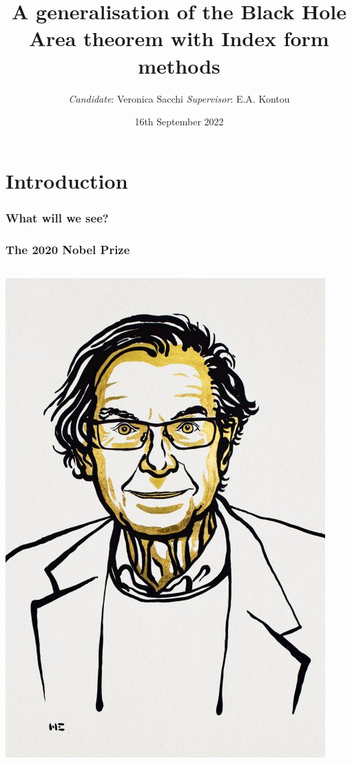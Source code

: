 \documentclass[]{beamer}
\title[Generalisation of BH Area theorem]
{A generalisation of the Black Hole Area theorem with Index form methods}
\institute[UniPi]{\texttt{[image: Immagini/LogoUniPi/marchio\_unipi\_pant541.pdf]}}
\author[Veronica Sacchi]{\textit{Candidate}: Veronica Sacchi \hfill\textit{Supervisor}: E.A. Kontou}
\date[16-09-2022]{16th September 2022}
\begin{document}

	\begin{frame}
	\titlepage
	\end{frame}
	\section{Introduction}
	\begin{frame}
		\frametitle{What will we see?}
		\tableofcontents
	\end{frame}
	\begin{frame}
		\frametitle{The 2020 Nobel Prize}
		\begin{columns}
			\column{0.52\textwidth}
			\includegraphics[scale=0.39]{Immagini/Penrose-nobel.jpg}

\end{columns}
\end{frame}
\end{document}
